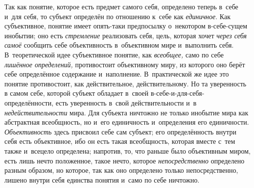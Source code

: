 Так как понятие, которое есть предмет самого себя, определено
теперь в~себе и~для себя, то субъект определён по отношению к~себе как
{\em единичное}. Как
субъективное, понятие имеет опять-таки предпосылку о~некотором в-себе-сущем
инобытии; оно есть {\em стремление}
реализовать себя, цель, которая хочет
{\em через себя самоё}
сообщить себе объективность в~объективном мире и~выполнить
себя. В~теоретической идее субъективное понятие, как
{\em всеобщее,} само по
себе {\em лишённое определений,}
противостоит объективному миру, из которого оно берёт себе
определённое содержание и~наполнение. В~практической же идее это понятие
противостоит, как действительное, действительному. Но та уверенность в
самом себе, которой субъект обладает в~своей
в-себе-и-для-себя-определённости, есть уверенность в~свой действительности
и~в {\em недействительности}
мира. Для субъекта ничтожно не только инобытие мира как
абстрактная всеобщность, но и~его единичность и~определения его
единичности. {\em Объективность}
здесь присвоил себе сам субъект; его определённость внутри
себя есть объективное, ибо он есть такая всеобщность, которая вместе с~тем
также и~всецело определена; напротив, то, что раньше было объективным
миром, есть лишь нечто положенное, такое нечто, которое
{\em непосредственно}
определено разным образом, но которое, так как оно определено
только непосредственно, лишено внутри себя единства понятия и~само по себе
ничтожно.

